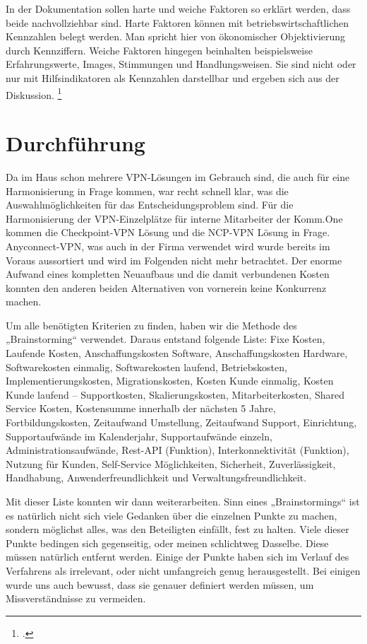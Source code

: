 In der Dokumentation sollen harte und weiche Faktoren so erklärt werden, dass beide nachvollziehbar sind. Harte Faktoren können mit betriebswirtschaftlichen Kennzahlen belegt werden. Man spricht hier von ökonomischer Objektivierung durch Kennziffern. Weiche Faktoren hingegen beinhalten beispielsweise Erfahrungswerte, Images, Stimmungen und Handlungsweisen. Sie sind nicht oder nur mit Hilfsindikatoren als Kennzahlen darstellbar und ergeben sich aus der Diskussion. \footcite[Vgl. ][S. 1 f.]{Prof.Dr.JanLies.2018}


\section{Durchführung} %
\label{sec:Durchführung}

Da im Haus schon mehrere VPN-Lösungen im Gebrauch sind, die auch für eine Harmonisierung in Frage kommen, war recht schnell klar, was die Auswahlmöglichkeiten für das Entscheidungsproblem sind. Für die Harmonisierung der VPN-Einzelplätze für interne Mitarbeiter der Komm.One kommen die Checkpoint-VPN Lösung und die NCP-VPN Lösung in Frage. Anyconnect-VPN, was auch in der Firma verwendet wird wurde bereits im Voraus aussortiert und wird im Folgenden nicht mehr betrachtet. Der enorme Aufwand eines kompletten Neuaufbaus und die damit verbundenen Kosten konnten den anderen beiden Alternativen von vornerein keine Konkurrenz machen.

Um alle benötigten Kriterien zu finden, haben wir die Methode des „Brainstorming“ verwendet. Daraus entstand folgende Liste: Fixe Kosten, Laufende Kosten, Anschaffungskosten Software, Anschaffungskosten Hardware, Softwarekosten einmalig, Softwarekosten laufend, Betriebskosten, Implementierungskosten, Migrationskosten, Kosten Kunde einmalig, Kosten Kunde laufend – Supportkosten, Skalierungskosten, Mitarbeiterkosten, Shared Service Kosten, Kostensumme innerhalb der nächsten 5 Jahre, Fortbildungskosten, Zeitaufwand Umstellung, Zeitaufwand Support, Einrichtung, Supportaufwände im Kalenderjahr, Supportaufwände einzeln, Administrationsaufwände, Rest-API (Funktion), Interkonnektivität (Funktion), Nutzung für Kunden, Self-Service Möglichkeiten, Sicherheit, Zuverlässigkeit, Handhabung, Anwenderfreundlichkeit und Verwaltungsfreundlichkeit.

Mit dieser Liste konnten wir dann weiterarbeiten. Sinn eines „Brainstormings“ ist es natürlich nicht sich viele Gedanken über die einzelnen Punkte zu machen, sondern möglichst alles, was den Beteiligten einfällt, fest zu halten. Viele dieser Punkte bedingen sich gegenseitig, oder meinen schlichtweg Dasselbe. Diese müssen natürlich entfernt werden. Einige der Punkte haben sich im Verlauf des Verfahrens als irrelevant, oder nicht umfangreich genug herausgestellt. Bei einigen wurde uns auch bewusst, dass sie genauer definiert werden müssen, um Missverständnisse zu vermeiden.


